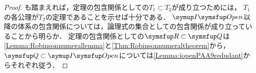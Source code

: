 \begin{proof}
	も踏まえれば，定理の包含関係としての\(T_1 \subset T_2\)が成り立つためには，
	\(T_1\)の各公理が\(T_2\)の定理であることを示せば十分である．
	\(\OpenFormulaInduction\)以降の体系の包含関係については，論理式の集合としての包含関係が成り立っていることから明らか．
	定理の包含関係としての\(\RArithmetic \subset \Robinson\)は\cref{Lemma:Robinsonnumerallemma}と\cref{Thm:Robinsonnumeraltheorem}から，
	\(\Robinson \subset \OpenFormulaInduction\)については\cref{Lemma:iopenPAA9redudant}からそれぞれ従う．
\end{proof}